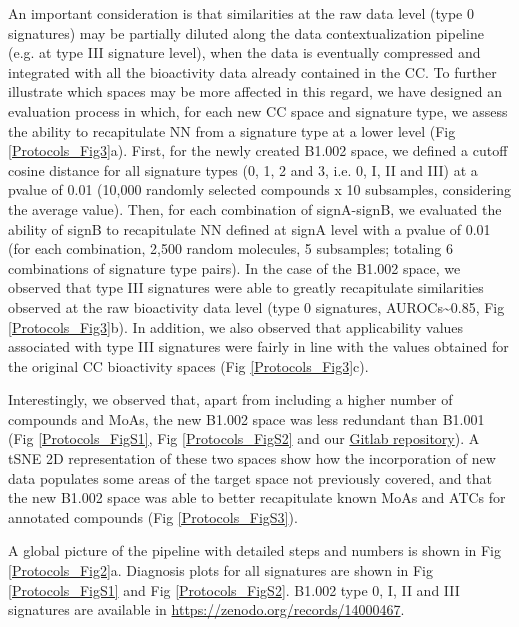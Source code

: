 An important consideration is that similarities at the raw data level (type 0 signatures) may be partially diluted along the data contextualization pipeline (e.g. at type III signature level), when the data is eventually compressed and integrated with all the bioactivity data already contained in the CC. To further illustrate which spaces may be more affected in this regard, we have designed an evaluation process in which, for each new CC space and signature type, we assess the ability to recapitulate NN from a signature type at a lower level (Fig \ref{Protocols_Fig3}a). First, for the newly created B1.002 space, we defined a cutoff cosine distance for all signature types (0, 1, 2 and 3, i.e. 0, I, II and III) at a pvalue of 0.01 (10,000 randomly selected compounds x 10 subsamples, considering the average value). Then, for each combination of signA-signB, we evaluated the ability of signB to recapitulate NN defined at signA level with a pvalue of 0.01 (for each combination, 2,500 random molecules, 5 subsamples; totaling 6 combinations of signature type pairs). In the case of the B1.002 space, we observed that type III signatures were able to greatly recapitulate similarities observed at the raw bioactivity data level (type 0 signatures, AUROCs\textasciitilde0.85, Fig \ref{Protocols_Fig3}b). In addition, we also observed that applicability values associated with type III signatures were fairly in line with the values obtained for the original CC bioactivity spaces (Fig \ref{Protocols_Fig3}c).

Interestingly, we observed that, apart from including a higher number of compounds and MoAs, the new B1.002 space was less redundant than B1.001 (Fig \ref{Protocols_FigS1}, Fig \ref{Protocols_FigS2} and our \href{https://gitlabsbnb.irbbarcelona.org/packages/protocols}{Gitlab repository}). A tSNE 2D representation of these two spaces show how the incorporation of new data populates some areas of the target space not previously covered, and that the new B1.002 space was able to better recapitulate known MoAs and ATCs for annotated compounds (Fig \ref{Protocols_FigS3}). 

A global picture of the pipeline with detailed steps and numbers is shown in Fig \ref{Protocols_Fig2}a. Diagnosis plots for all signatures are shown in Fig \ref{Protocols_FigS1} and Fig \ref{Protocols_FigS2}. B1.002 type 0, I, II and III signatures are available in \href{https://zenodo.org/records/14000467}{https://zenodo.org/records/14000467}. 

